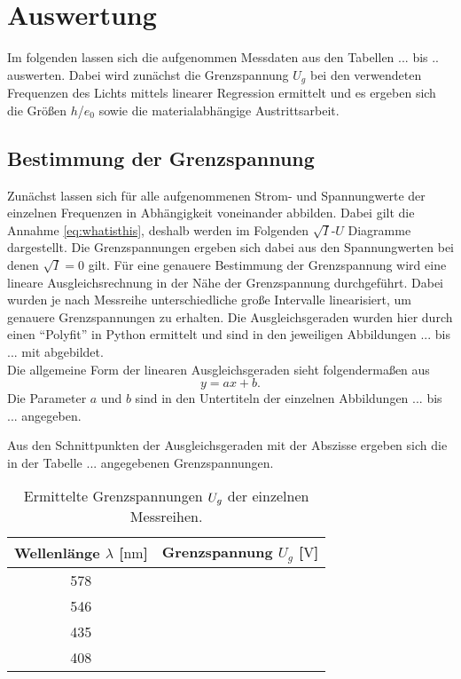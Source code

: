 \section{Auswertung}

Im folgenden lassen sich die aufgenommen Messdaten aus den Tabellen ... bis .. auswerten. Dabei wird zunächst die Grenzspannung $U_{g}$ bei den verwendeten Frequenzen des Lichts mittels linearer Regression ermittelt und es ergeben sich
die Größen $h$/$e_{0}$ sowie die materialabhängige Austrittsarbeit.


\subsection{Bestimmung der Grenzspannung}

Zunächst lassen sich für alle aufgenommenen Strom- und Spannungwerte der einzelnen Frequenzen in Abhängigkeit voneinander abbilden. Dabei gilt die Annahme \eqref{eq:whatisthis}, deshalb werden im Folgenden $\sqrt{I}$-$U$ Diagramme dargestellt.
Die Grenzspannungen ergeben sich dabei aus den Spannungwerten bei denen $\sqrt{I} = 0$ gilt.
Für eine genauere Bestimmung der Grenzspannung wird eine lineare Ausgleichsrechnung in der Nähe der Grenzspannung durchgeführt.  Dabei wurden je nach Messreihe unterschiedliche große
Intervalle linearisiert, um genauere Grenzspannungen zu erhalten. 
Die Ausgleichsgeraden wurden hier durch einen \enquote{Polyfit} in Python \cite{python} ermittelt und sind in den jeweiligen Abbildungen ... bis ... mit abgebildet.
\\
Die allgemeine Form der linearen Ausgleichsgeraden sieht folgendermaßen aus
\begin{equation}
    \label{eqn:okay}
y = ax + b.
\end{equation}
Die Parameter $a$ und $b$ sind in den Untertiteln der einzelnen Abbildungen ... bis ... angegeben.


Aus den Schnittpunkten der Ausgleichsgeraden mit der Abszisse ergeben sich die in der Tabelle ... angegebenen Grenzspannungen.


\begin{table}
    \caption{Ermittelte Grenzspannungen $\protect U_{g}$ der einzelnen Messreihen.}
    \centering
    \label{tab:ugrenz}
    \begin{tabular}{c c}
        \toprule
        Wellenlänge $\lambda$ [$\si{\nano\meter}$] & Grenzspannung $U_{g}$ [$\si{\volt}$] \\
        \midrule
        578 & ~\\
        546 & ~\\
        435 & ~\\
        408 & ~\\
        \bottomrule    
    \end{tabular}
\end{table}

